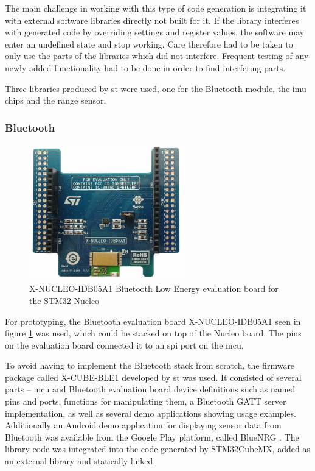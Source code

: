 The main challenge in working with this type of code generation is integrating it with external software libraries directly not built for it. If the library interferes with generated code by overriding settings and register values, the software may enter an undefined state and stop working. Care therefore had to be taken to only use the parts of the libraries which did not interfere. Frequent testing of any newly added functionality had to be done in order to find interfering parts.

Three libraries produced by \gls{st} were used, one for the Bluetooth module, the \gls{imu} chips and the range sensor.

\subsubsection{Bluetooth}
\label{bluetooth}

\begin{figure}[H]
\centering
\includegraphics[width=0.6\textwidth]{Figures/x-nucleo-idb05a1.jpg}
\caption{X-NUCLEO-IDB05A1 Bluetooth Low Energy evaluation board for the STM32 Nucleo}
\label{bt-eval-board}
\end{figure}

For prototyping, the Bluetooth evaluation board X-NUCLEO-IDB05A1 \cite{x-nucleo-idb05a1} seen in figure \ref{bt-eval-board} was used, which could be stacked on top of the Nucleo board. The pins on the evaluation board connected it to an \gls{spi} port on the \gls{mcu}.

To avoid having to implement the Bluetooth stack from scratch, the firmware package called X-CUBE-BLE1 \cite{x-cube-ble1} developed by \gls{st} was used. It consisted of several parts -- \gls{mcu} and Bluetooth evaluation board device definitions such as named pins and ports, functions for manipulating them, a Bluetooth GATT server implementation, as well as several demo applications showing usage examples. Additionally an Android demo application for displaying sensor data from Bluetooth was available from the Google Play platform, called BlueNRG \cite{bluenrg-app}. The library code was integrated into the code generated by STM32CubeMX, added as an external library and statically linked.

